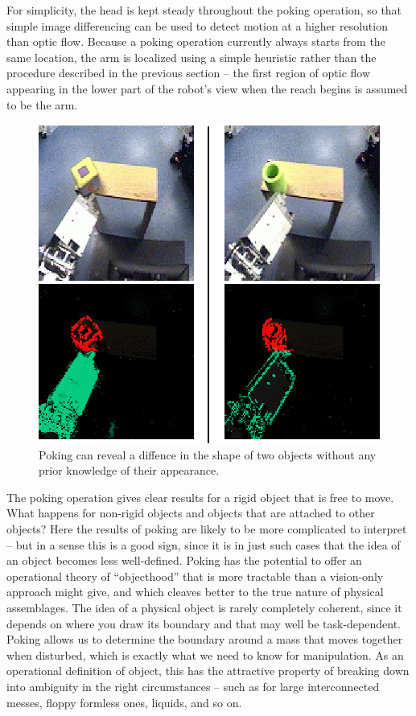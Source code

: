 \ifverbose
For simplicity, the head is kept steady throughout the poking
operation, so that simple image differencing can be used to detect
motion at a higher resolution than optic flow.  Because a poking
operation currently always starts from the same location, the arm
is localized using a simple heuristic rather than the procedure described
in the previous section -- the first region of optic flow appearing
in the lower part of the robot's view when the reach begins
is assumed to be the arm.
\fi

\ifverbose
\begin{figure}[tbh]
\begin{center}
\includegraphics[width=\columnwidth]{cube-and-cylinder.eps}
\caption{ 
\label{fig:cube-and-cylinder}
%
  Poking can reveal a diffence in the shape of two objects without
  any prior knowledge of their appearance.
%
}
\end{center}
\end{figure}
\fi

The poking operation gives clear results for a rigid object that is
free to move.  What happens for non-rigid objects and objects that are
attached to other objects?  Here the results of poking are likely to
be more complicated to interpret -- but in a sense this is a good
sign, since it is in just such cases that the idea of an object
becomes less well-defined.  Poking has the potential to offer an
operational theory of ``objecthood'' that is more tractable than a
vision-only approach might give, and which cleaves better to the true
nature of physical assemblages.  The idea of a physical object is
rarely completely coherent, since it depends on where you draw its
boundary and that may well be task-dependent.  Poking allows us to
determine the boundary around a mass that moves together when
disturbed, which is exactly what we need to know for manipulation.  As
an operational definition of object, this has the attractive property
of breaking down into ambiguity in the right circumstances -- such
as for large interconnected messes, floppy formless ones, liquids,
and so on.

